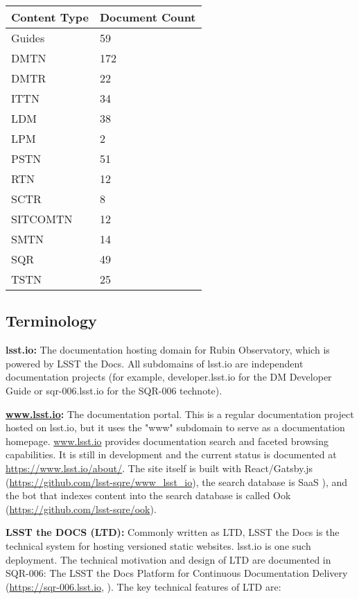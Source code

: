 \begin{longtable}{p{}p{}}\hline
\textbf{Content Type} & \textbf{Document Count}  \\\hline
Guides		& 59 		\\\hline
DMTN 		& 172	\\\hline
DMTR		& 22 		\\\hline
ITTN		& 34 		\\\hline
LDM			& 38 		\\\hline
LPM 		& 2 		\\\hline
PSTN  		& 51  	\\\hline
RTN   		& 12 		\\\hline
SCTR 		& 8 		\\\hline
SITCOMTN	& 12 		\\\hline
SMTN 		& 14		\\\hline
SQR 		& 49 		\\\hline
TSTN 		& 25          \\\hline          
\end{longtable}

\subsection{Terminology}

{\bf lsst.io:}  The documentation hosting domain for Rubin Observatory, which is powered by LSST the Docs. All subdomains of lsst.io are independent documentation projects (for example, developer.lsst.io for the DM Developer Guide or sqr-006.lsst.io for the SQR-006 technote).

{\bf \url{www.lsst.io}:}  The documentation portal. This is a regular documentation project hosted on lsst.io, but it uses the "www" subdomain to serve as a documentation homepage. \url{www.lsst.io} provides documentation search and faceted browsing capabilities. It is still in development and the current status is documented at \url{https://www.lsst.io/about/}. The site itself is built with React/Gatsby.js (\url{https://github.com/lsst-sqre/www_lsst_io}), the search database is SaaS \citep{SaaS-cite}), and the bot that indexes content into the search database is called Ook (\url{https://github.com/lsst-sqre/ook}).

{\bf LSST the DOCS (LTD):}  Commonly written as LTD, LSST the Docs is the technical system for hosting versioned static websites. lsst.io is one such deployment. The technical motivation and design of LTD are documented in SQR-006: The LSST the Docs Platform for Continuous Documentation Delivery (\url{https://sqr-006.lsst.io}, ). The key technical features of LTD are:

